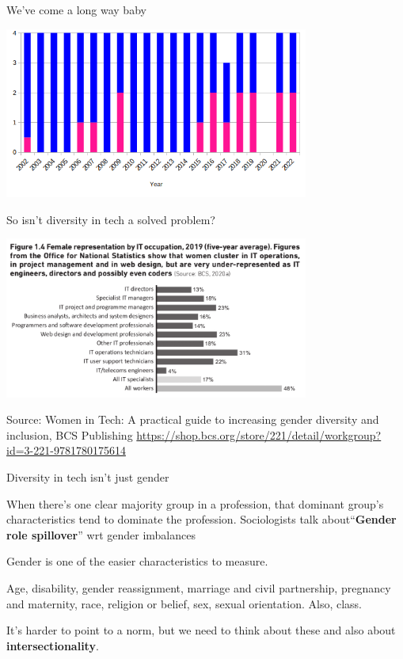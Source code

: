 \documentclass[xcolor=table,aspectratio=169]{beamer}
\begin{document}
\begin{frame}{We've come a long way baby}

	\includegraphics[width=10cm]{figs/accu_key.png}
\end{frame}
\begin{frame}{So isn't diversity in tech a solved problem?}

	\includegraphics[width=10cm]{figs/it_profession_gender.png}

	\tiny{Source: Women in Tech: A practical guide to increasing gender diversity and inclusion, BCS Publishing \url{https://shop.bcs.org/store/221/detail/workgroup?id=3-221-9781780175614}}
\end{frame}

\begin{frame}{Diversity in tech isn't just gender}

	When there's one clear majority group in a profession, that dominant group's characteristics tend to dominate the profession.  Sociologists talk about``\textbf{Gender role spillover}''  wrt gender imbalances


	\vspace{0.5em}

	Gender is one of the easier characteristics to measure.  	

	\vspace{0.5em}

	Age, disability, gender reassignment, marriage and civil partnership, pregnancy and maternity, race, religion or belief, sex, sexual orientation. Also, class. 


	\vspace{0.5em}


	It's harder to point to a norm, but we need to think about these and also about \textbf{intersectionality}.

\end{frame}
\end{document}

